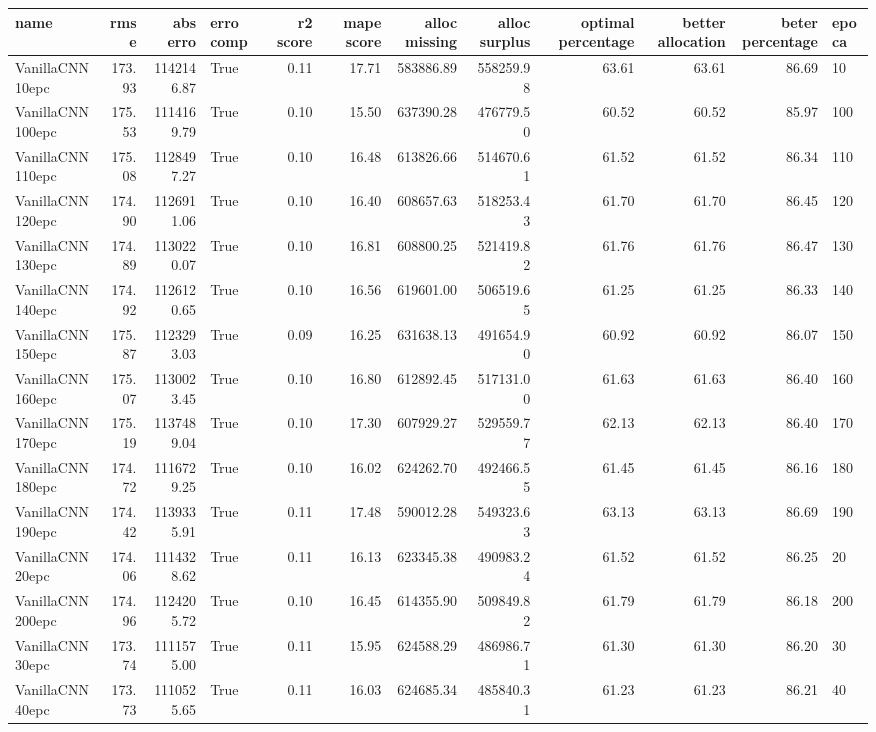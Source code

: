 \begin{tabular}{lrrlrrrrrrrl}
\toprule
name & rmse & abs erro & erro comp & r2 score & mape score & alloc missing & alloc surplus & optimal percentage & better allocation & beter percentage & epoca \\
\midrule
VanillaCNN10epc & 173.93 & 1142146.87 & True & 0.11 & 17.71 & 583886.89 & 558259.98 & 63.61 & 63.61 & 86.69 & 10 \\
VanillaCNN100epc & 175.53 & 1114169.79 & True & 0.10 & 15.50 & 637390.28 & 476779.50 & 60.52 & 60.52 & 85.97 & 100 \\
VanillaCNN110epc & 175.08 & 1128497.27 & True & 0.10 & 16.48 & 613826.66 & 514670.61 & 61.52 & 61.52 & 86.34 & 110 \\
VanillaCNN120epc & 174.90 & 1126911.06 & True & 0.10 & 16.40 & 608657.63 & 518253.43 & 61.70 & 61.70 & 86.45 & 120 \\
VanillaCNN130epc & 174.89 & 1130220.07 & True & 0.10 & 16.81 & 608800.25 & 521419.82 & 61.76 & 61.76 & 86.47 & 130 \\
VanillaCNN140epc & 174.92 & 1126120.65 & True & 0.10 & 16.56 & 619601.00 & 506519.65 & 61.25 & 61.25 & 86.33 & 140 \\
VanillaCNN150epc & 175.87 & 1123293.03 & True & 0.09 & 16.25 & 631638.13 & 491654.90 & 60.92 & 60.92 & 86.07 & 150 \\
VanillaCNN160epc & 175.07 & 1130023.45 & True & 0.10 & 16.80 & 612892.45 & 517131.00 & 61.63 & 61.63 & 86.40 & 160 \\
VanillaCNN170epc & 175.19 & 1137489.04 & True & 0.10 & 17.30 & 607929.27 & 529559.77 & 62.13 & 62.13 & 86.40 & 170 \\
VanillaCNN180epc & 174.72 & 1116729.25 & True & 0.10 & 16.02 & 624262.70 & 492466.55 & 61.45 & 61.45 & 86.16 & 180 \\
VanillaCNN190epc & 174.42 & 1139335.91 & True & 0.11 & 17.48 & 590012.28 & 549323.63 & 63.13 & 63.13 & 86.69 & 190 \\
VanillaCNN20epc & 174.06 & 1114328.62 & True & 0.11 & 16.13 & 623345.38 & 490983.24 & 61.52 & 61.52 & 86.25 & 20 \\
VanillaCNN200epc & 174.96 & 1124205.72 & True & 0.10 & 16.45 & 614355.90 & 509849.82 & 61.79 & 61.79 & 86.18 & 200 \\
VanillaCNN30epc & 173.74 & 1111575.00 & True & 0.11 & 15.95 & 624588.29 & 486986.71 & 61.30 & 61.30 & 86.20 & 30 \\
VanillaCNN40epc & 173.73 & 1110525.65 & True & 0.11 & 16.03 & 624685.34 & 485840.31 & 61.23 & 61.23 & 86.21 & 40 \\

\end{tabular}
